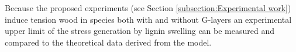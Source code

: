 Because the proposed experiments (see Section \ref{subsection:Experimental work}) induce tension wood in species
both with and without G-layers an experimental upper limit of the stress
generation by lignin swelling can be measured and
compared to the theoretical data derived from the model.